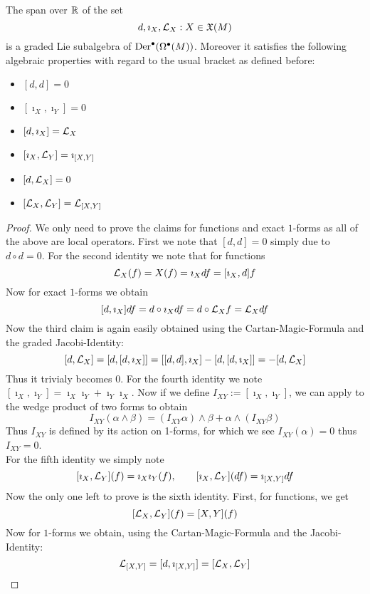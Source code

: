 \begin{prop}
  The span over $\mathbb{R}$ of the set
  $$ {d, \imath_X, \mathcal{L}_{X}: X \in \mathfrak{X}(M)} $$
  is a graded Lie subalgebra of $\operatorname{Der}^\bullet(\Omega^\bullet(M))$. Moreover it satisfies the following algebraic properties with regard to the usual bracket as defined before:
  \begin{multicols}{3}
    \begin{itemize}
      \item[(1)] $[d,d] = 0$
      \item[(4)] $[\imath_X, \imath_Y] = 0$
      \item[(2)] $[d, \imath_X] = \mathcal{L}_{X}$
      \item[(5)] $[\imath_X, \mathcal{L}_{Y}] = \imath_{[X,Y]}$
      \item[(3)] $[d, \mathcal{L}_{X}] = 0$
      \item[(6)] $[\mathcal{L}_{X}, \mathcal{L}_{Y}] = \mathcal{L}_{[X,Y]}$
    \end{itemize}
\end{multicols}
  \begin{proof}
    We only need to prove the claims for functions and exact $1$-forms as all of the above are local operators. First we note that $[d,d]=0$ simply due to $d \circ d = 0$. For the second identity we note that for functions
    $$ \mathcal{L}_{X}(f) = X(f) = \imath_X df = [\imath_X, d]f $$
    Now for exact $1$-forms we obtain
    $$ [d, \imath_X] df = d\circ \imath_X df = d \circ \mathcal{L}_{X}f = \mathcal{L}_{X} df $$
    Now the third claim is again easily obtained using the Cartan-Magic-Formula and the graded Jacobi-Identity:
    $$ [d, \mathcal{L}_{X}] = [d,[d,\imath_X]] = [[d,d],\imath_X] - [d,[d,\imath_X]] = - [d, \mathcal{L}_{X}]$$
    Thus it trivialy becomes $0$. For the fourth identity we note $[\imath_X, \imath_Y] = \imath_X \imath_Y + \imath_Y \imath_X$. Now if we define $I_{XY} := [\imath_X, \imath_Y]$, we can apply to the wedge product of two forms to obtain
    $$ I_{XY} (\alpha \wedge \beta) = (I_{XY}\alpha) \wedge \beta +  \alpha \wedge (I_{XY}\beta) $$
    Thus $I_{XY}$ is defined by its action on 1-forms, for which we see $I_{XY}(\alpha) = 0$ thus $I_{XY} =0$.\\
    For the fifth identity we simply note
    $$ [\imath_X, \mathcal{L}_{Y}](f) = \imath_X \imath_Y (f), \quad \quad [\imath_X, \mathcal{L}_{Y}](df) = \imath_{[X,Y]} df $$
    Now the only one left to prove is the sixth identity. First, for functions, we get
    $$ [\mathcal{L}_{X}, \mathcal{L}_{Y}] (f) = [X,Y](f) $$
    Now for $1$-forms we obtain, using the Cartan-Magic-Formula and the Jacobi-Identity:
    $$ \mathcal{L}_{[X,Y]} = [d, \imath_{[X,Y]}] = [\mathcal{L}_{X}, \mathcal{L}_{Y}]$$
  \end{proof}
\end{prop}


